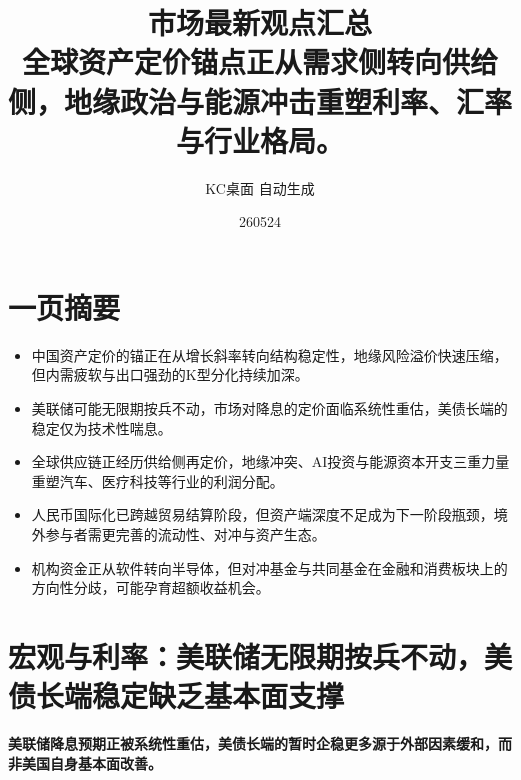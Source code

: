 \documentclass[11pt]{ctexart}
\title{\textbf{市场最新观点汇总}\\[0.4em]{\large 全球资产定价锚点正从需求侧转向供给侧，地缘政治与能源冲击重塑利率、汇率与行业格局。}}
\author{KC桌面 自动生成}
\date{260524}
\begin{document}
\maketitle
\section*{一页摘要}
\begin{itemize}
  \item 中国资产定价的锚正在从增长斜率转向结构稳定性，地缘风险溢价快速压缩，但内需疲软与出口强劲的K型分化持续加深。
  \item 美联储可能无限期按兵不动，市场对降息的定价面临系统性重估，美债长端的稳定仅为技术性喘息。
  \item 全球供应链正经历供给侧再定价，地缘冲突、AI投资与能源资本开支三重力量重塑汽车、医疗科技等行业的利润分配。
  \item 人民币国际化已跨越贸易结算阶段，但资产端深度不足成为下一阶段瓶颈，境外参与者需更完善的流动性、对冲与资产生态。
  \item 机构资金正从软件转向半导体，但对冲基金与共同基金在金融和消费板块上的方向性分歧，可能孕育超额收益机会。
\end{itemize}
\section{宏观与利率：美联储无限期按兵不动，美债长端稳定缺乏基本面支撑}
\textbf{美联储降息预期正被系统性重估，美债长端的暂时企稳更多源于外部因素缓和，而非美国自身基本面改善。}
\end{document}
